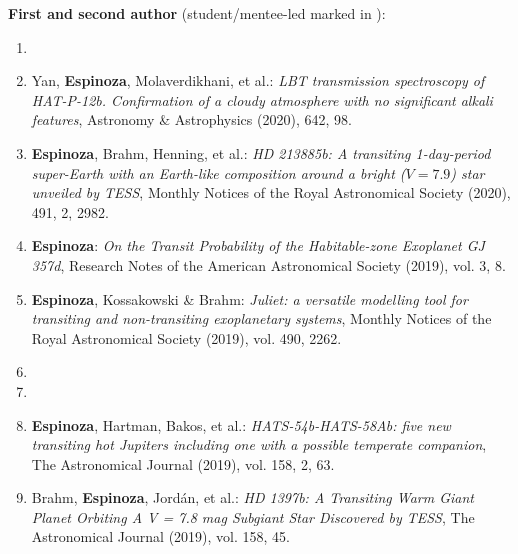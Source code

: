 \documentclass[12pt, a4paper]{article} %
\begin{document}
\begin{flushleft}%
  \setlength{\leftskip}{0.2cm}%
\textbf{First and second author} (student/mentee-led marked in {}):
\begin{enumerate}
\setlength\itemsep{0.05cm}
\item  {}
\item Yan, \textbf{Espinoza}, Molaverdikhani, et al.: \textit{LBT transmission spectroscopy of HAT-P-12b. Confirmation of a cloudy atmosphere with no significant alkali features}, Astronomy \& Astrophysics (2020), 642, 98.
\item \textbf{Espinoza}, Brahm, Henning, et al.: \textit{HD 213885b: A transiting 1-day-period super-Earth with an Earth-like composition around a bright ($V=7.9$) star unveiled by TESS}, Monthly Notices of the Royal Astronomical Society (2020), 491, 2, 2982.
\item \textbf{Espinoza}: \textit{On the Transit Probability of the Habitable-zone Exoplanet GJ 357d}, Research Notes of the American Astronomical Society (2019), vol. 3, 8.
\item \textbf{Espinoza}, Kossakowski \& Brahm: \textit{Juliet: a versatile modelling tool for transiting and non-transiting exoplanetary systems}, Monthly Notices of the Royal Astronomical Society (2019), vol. 490, 2262. 
\item  {}
\item  {}
\item \textbf{Espinoza}, Hartman, Bakos, et al.: \textit{HATS-54b-HATS-58Ab: five new transiting hot Jupiters including one with a possible temperate companion}, The Astronomical Journal (2019), vol. 158, 2, 63.
\item Brahm, \textbf{Espinoza}, Jord\'an, et al.: \textit{HD 1397b: A Transiting Warm Giant Planet Orbiting A V = 7.8 mag Subgiant Star Discovered by TESS}, The Astronomical Journal (2019), vol. 158, 45.

\end{enumerate}
\end{flushleft}
\end{document}

